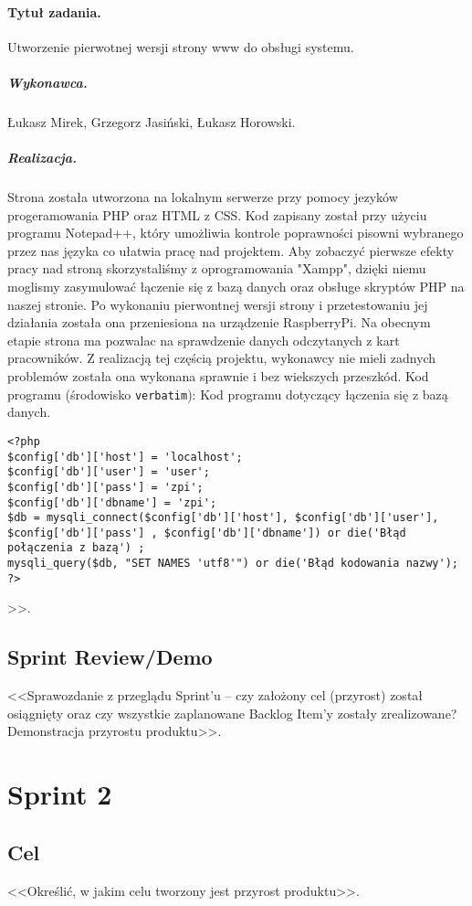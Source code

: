 \documentclass[a4paper]{article}
\begin{document}
\paragraph{Tytuł zadania.} Utworzenie pierwotnej wersji strony www do obsługi systemu.
\subparagraph{Wykonawca.} Łukasz Mirek, Grzegorz Jasiński, Łukasz Horowski.
\subparagraph{Realizacja.} Strona została utworzona na lokalnym serwerze przy pomocy jezyków progeramowania PHP oraz HTML z CSS. Kod zapisany został przy użyciu programu Notepad++, który umożliwia kontrole poprawności pisowni wybranego przez nas języka co ułatwia pracę nad projektem. Aby zobaczyć pierwsze efekty pracy nad stroną skorzystaliśmy z oprogramowania "Xampp", dzięki niemu moglismy zasymulować łączenie się z bazą danych oraz obsługe skryptów PHP na naszej stronie. Po wykonaniu pierwontnej wersji strony i przetestowaniu jej działania została ona przeniesiona na urządzenie RaspberryPi. Na obecnym etapie strona ma pozwalac na sprawdzenie danych odczytanych z kart pracowników. Z realizacją tej częścią projektu, wykonawcy nie mieli zadnych problemów została ona wykonana sprawnie i bez wiekszych przeszkód.  
Kod programu (środowisko \texttt{verbatim}): 
Kod programu dotyczący łączenia się z bazą danych.
\begin{verbatim}
<?php
$config['db']['host'] = 'localhost';
$config['db']['user'] = 'user';
$config['db']['pass'] = 'zpi';
$config['db']['dbname'] = 'zpi';
$db = mysqli_connect($config['db']['host'], $config['db']['user'], $config['db']['pass'] , $config['db']['dbname']) or die('Błąd połączenia z bazą') ;
mysqli_query($db, "SET NAMES 'utf8'") or die('Błąd kodowania nazwy');
?>
\end{verbatim}>>.

\subsection{Sprint Review/Demo}
<<Sprawozdanie z przeglądu Sprint'u -- czy założony cel (przyrost) został osiągnięty oraz czy wszystkie zaplanowane Backlog Item'y zostały zrealizowane? Demonstracja przyrostu produktu>>.

\section{Sprint 2}

\subsection{Cel} <<Określić, w jakim celu tworzony jest przyrost produktu>>.
\end{document}
